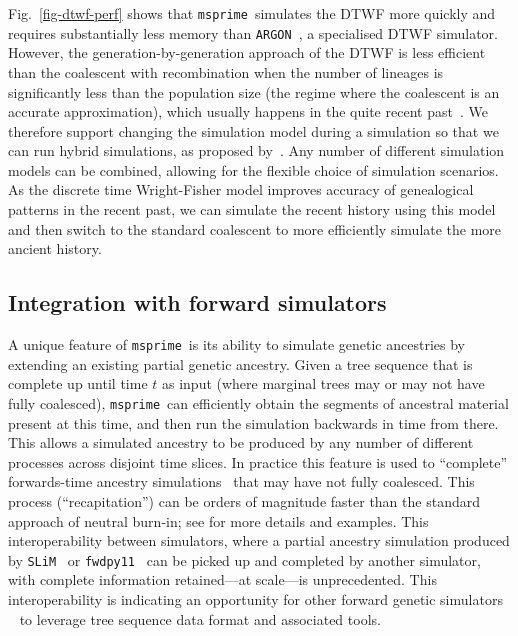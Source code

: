 \documentclass{article}
\newcommand{\msprime}[0]{\texttt{msprime}}
\newcommand{\SLiM}[0]{\texttt{SLiM}}
\newcommand{\fwdpy}[0]{\texttt{fwdpy11}}
\newcommand{\ARGON}[0]{\texttt{ARGON}}
\begin{document}
Fig.~\ref{fig-dtwf-perf} shows that \msprime\ simulates the DTWF
more quickly and requires substantially less memory than
\ARGON~\citep{palamara2016argon}, a specialised DTWF simulator.
However, the generation-by-generation approach of the DTWF is less
efficient than the coalescent with recombination when the
number of lineages is significantly less than the population size
(the regime where the coalescent is an accurate approximation),
which usually happens in the quite recent
past~\cite{bhaskar2014distortion}.
We therefore support changing the simulation model during a simulation
so that we can run hybrid simulations, as proposed by~\cite{bhaskar2014distortion}.
Any number of different simulation models can be combined, allowing for the
flexible choice of simulation scenarios.
As the discrete time Wright-Fisher model improves accuracy of genealogical
patterns in the recent past, we can simulate the recent history using this
model and then switch to the standard coalescent to more efficiently simulate
the more ancient history.

\subsection*{Integration with forward simulators}
A unique feature of \msprime\ is its ability to simulate
genetic ancestries by extending an existing partial
genetic ancestry. Given a tree sequence that
is complete up until time $t$ as input
(where marginal trees may or may not have fully coalesced),
\msprime\ can efficiently obtain the segments of ancestral material
present at this time, and then run the simulation backwards in time from there.
This allows a simulated ancestry to be produced by any
number of different processes across disjoint time slices.
In practice this feature is used to ``complete''
forwards-time ancestry simulations~\citep{kelleher2018efficient}
that may have not fully coalesced. This process
(``recapitation'') can be orders of magnitude faster than
the standard approach of neutral burn-in; see
\cite{haller2018tree} for more details and examples.
This interoperability between simulators, where a partial ancestry
simulation produced by \SLiM~\citep{haller2019slim}
or \fwdpy~\citep{thornton2014cpp} can be picked up and completed
by another simulator, with complete information
retained---at scale---is unprecedented.
This interoperability is indicating an opportunity for
other forward genetic simulators ~\citep[e.g.][]{Gaynor2021AlphaSimR}
to leverage tree sequence data format and associated tools. 
\end{document}
